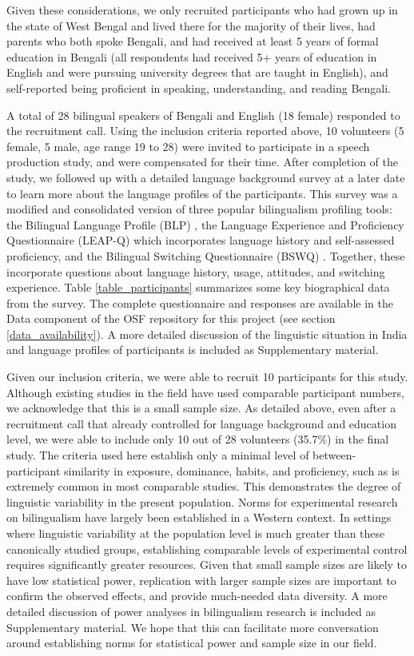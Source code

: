 \documentclass[12 pt]{article}
\begin{document}
Given these considerations, we only recruited participants who had grown up in the state of West Bengal and lived there for the majority of their lives, had parents who both spoke Bengali, and had received at least 5 years of formal education in Bengali (all respondents had received 5+ years of education in English and were pursuing university degrees that are taught in English), and self-reported being proficient in speaking, understanding, and reading Bengali. 
   
A total of 28 bilingual speakers of Bengali and English (18 female) responded to the recruitment call. Using the inclusion criteria reported above, 10 volunteers (5 female, 5 male, age range 19 to 28) were invited to participate in a speech production study, and were compensated for their time. After completion of the study, we followed up with a detailed language background survey at a later date to learn more about the language profiles of the participants. This survey was a modified and consolidated version of three popular bilingualism profiling tools: the Bilingual Language Profile (BLP) \citep{blp}, the Language Experience and Proficiency Questionnaire (LEAP-Q) \citep{leap-q} which incorporates language history and self-assessed proficiency, and the Bilingual Switching Questionnaire (BSWQ) \citep{language_switching_questionnaire}. Together, these incorporate questions about language history, usage, attitudes, and switching experience. Table \ref{table_participants} summarizes some key biographical data from the survey. The complete questionnaire and responses are available in the Data component of the OSF repository for this project (see section \ref{data_availability}). A more detailed discussion of the linguistic situation in India and language profiles of participants is included as Supplementary material.


Given our inclusion criteria, we were able to recruit 10 participants for this study. Although existing studies in the field have used comparable participant numbers, we acknowledge that this is a small sample size. As detailed above, even after a recruitment call that already controlled for language background and education level, we were able to include only 10 out of 28 volunteers (35.7\%) in the final study. The criteria used here establish only a minimal level of between-participant similarity in exposure, dominance, habits, and proficiency, such as is extremely common in most comparable studies. This demonstrates the degree of linguistic variability in the present population. Norms for experimental research on bilingualism have largely been established in a Western context. In settings where linguistic variability at the population level is much greater than these canonically studied groups, establishing comparable levels of experimental control requires significantly greater resources. Given that small sample sizes are likely to have low statistical power, replication with larger sample sizes are important to confirm the observed effects, and provide much-needed data diversity. A more detailed discussion of power analyses in bilingualism research is included as Supplementary material. We hope that this can facilitate more conversation around establishing norms for statistical power and sample size in our field.  
\end{document}
